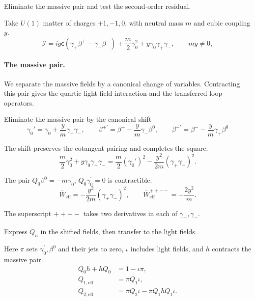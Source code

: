 \documentclass[11pt]{article}
\numberwithin{equation}{section}
\numberwithin{figure}{section}
\numberwithin{table}{section}
\begin{document}
\begin{proofbox}
Eliminate the massive pair and test the second-order residual.

Take $U(1)$ matter of charges $+1,-1,0$, with neutral mass $m$ and cubic coupling $y$.
\begin{equation}\label{eq-3-11}
\mathcal I=ig\mathsf c(\gamma_+\beta^+-\gamma_-\beta^-)+\frac m2\gamma_0^2+y\gamma_0\gamma_+\gamma_-,\qquad my\ne0,
\end{equation}

\paragraph{The massive pair.}\label{the-massive-pair}

We separate the massive fields by a canonical change of variables. Contracting this pair gives the quartic light-field interaction and the transferred loop operators.

Eliminate the massive pair by the canonical shift
\begin{equation}\label{eq-massshift}
\gamma_0'=\gamma_0+\frac ym\gamma_+\gamma_-,\qquad
\beta^{+\prime}=\beta^+-\frac ym\gamma_-\beta^0,\qquad
\beta^{-\prime}=\beta^--\frac ym\gamma_+\beta^0
\end{equation}

The shift preserves the cotangent pairing and completes the square.
\begin{equation}\label{eq-masssquare}
\frac m2\gamma_0^2+y\gamma_0\gamma_+\gamma_-
=\frac m2(\gamma_0')^2-\frac{y^2}{2m}(\gamma_+\gamma_-)^2.
\end{equation}

The pair $Q_0\beta^0=-m\gamma_0^{\prime}$, $Q_0\gamma_0^{\prime}=0$ is contractible.
\begin{equation}\label{b-00773}
\bar W_{\mathrm{eff}}=-\frac{y^2}{2m}(\gamma_+\gamma_-)^2,
\qquad\bar W_{\mathrm{eff}}^{++--}=-\frac{2y^2}{m}.
\end{equation}

The superscript $++--$ takes two derivatives in each of $\gamma_+,\gamma_-$.

Express $Q_n$ in the shifted fields, then transfer to the light fields.

Here $\pi$ sets $\gamma_0^{\prime},\beta^0$ and their jets to zero, $\iota$ includes light fields, and $h$ contracts the massive pair.
\begin{equation}\label{eq-3-15}
\begin{aligned}
Q_0h+hQ_0&=1-\iota\pi,\\
Q_{1,\mathrm{eff}}&=\pi Q_1\iota,\\
Q_{2,\mathrm{eff}}&=\pi Q_2\iota-
{\pi Q_1hQ_1\iota}.
\end{aligned}
\end{equation}


\end{proofbox}
\end{document}
